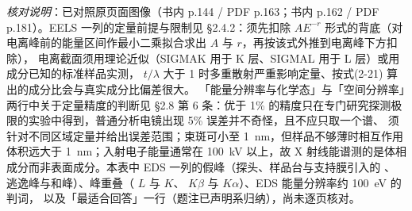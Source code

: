 \emph{核对说明}：已对照原页面图像（书内 p.144 / PDF p.163；书内 p.162 / PDF
p.181）。EELS 一列的定量前提与限制见 §2.4.2：须先扣除 $AE^{-r}$
形式的背底（对电离峰前的能量区间作最小二乘拟合求出 $A$ 与 $r$，再按该式外推到电离峰下方扣除），
电离截面须用理论近似（SIGMAK 用于 K 层、SIGMAL 用于 L 层）或用成分已知的标准样品实测，
$t/\lambda$ 大于 1 时多重散射严重影响定量、按式(2-21) 算出的成分比会与真实成分比偏差很大。
「能量分辨率与化学态」与「空间分辨率」两行中关于定量精度的判断见 §2.8 第 6 条：优于 1\%
的精度只在专门研究探测极限的实验中得到，普通分析电镜出现 5\% 误差并不奇怪，且不应只取一个谱、
须针对不同区域定量并给出误差范围；束斑可小至 \qty{1}{nm}，但样品不够薄时相互作用体积远大于
\qty{1}{nm}；入射电子能量通常在 \qty{100}{kV} 以上，故 X
射线能谱测的是体相成分而非表面成分。本表中 EDS 一列的假峰（探头、样品台与支持膜引入的 、
 逃逸峰与和峰）、峰重叠（ $L$ 与  $K$、
$K\beta$ 与  $K\alpha$）、EDS 能量分辨率约 \qty{100}{eV} 的判词，
以及「最适合回答」一行（题注已声明系归纳），尚未逐页核对。



